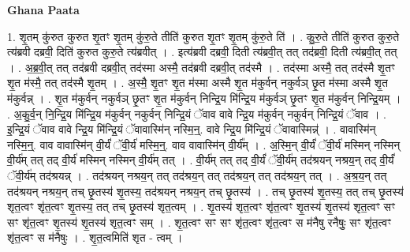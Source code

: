\documentclass[17pt]{extarticle}
\begin{document}
\textbf{Ghana Paata } \newline

1. शृ॒तम् कु॑रुत कुरुत शृ॒तꣳ शृ॒तम् कु॑रु॒ते तीति॑ कुरुत शृ॒तꣳ शृ॒तम् कु॑रु॒ते ति॑ । . कु॒रु॒ते तीति॑ कुरुत कुरु॒ते त्य॑ब्रवी दब्रवी॒ दिति॑ कुरुत कुरु॒ते त्य॑ब्रवीत् । . इत्य॑ब्रवी दब्रवी॒ दिती त्य॑ब्रवी॒त् तत् तद॑ब्रवी॒ दिती त्य॑ब्रवी॒त् तत् । . अ॒ब्र॒वी॒त् तत् तद॑ब्रवी दब्रवी॒त् तद॑स्मा अस्मै॒ तद॑ब्रवी दब्रवी॒त् तद॑स्मै । . तद॑स्मा अस्मै॒ तत् तद॑स्मै शृ॒तꣳ शृ॒त म॑स्मै॒ तत् तद॑स्मै शृ॒तम् । . अ॒स्मै॒ शृ॒तꣳ शृ॒त म॑स्मा अस्मै शृ॒त म॑कुर्वन् नकुर्वञ् छृ॒त म॑स्मा अस्मै शृ॒त म॑कुर्वन्न् । . शृ॒त म॑कुर्वन् नकुर्वञ् छृ॒तꣳ शृ॒त म॑कुर्वन् निन्द्रि॒य मि॑न्द्रि॒य म॑कुर्वञ् छृ॒तꣳ शृ॒त म॑कुर्वन् निन्द्रि॒यम् । . अ॒कु॒र्व॒न् नि॒न्द्रि॒य मि॑न्द्रि॒य म॑कुर्वन् नकुर्वन् निन्द्रि॒यं ॅवाव वावे न्द्रि॒य म॑कुर्वन् नकुर्वन् निन्द्रि॒यं ॅवाव । . इ॒न्द्रि॒यं ॅवाव वावे न्द्रि॒य मि॑न्द्रि॒यं ॅवावास्मि॑न् नस्मि॒न्॒. वावे न्द्रि॒य मि॑न्द्रि॒यं ॅवावास्मिन्न्॑ । . वावास्मि॑न् नस्मि॒न्॒. वाव वावास्मि॑न् वी॒र्यं॑ ॅवी॒र्य॑ मस्मि॒न्॒. वाव वावास्मि॑न् वी॒र्य᳚म् । . अ॒स्मि॒न् वी॒र्यं॑ ॅवी॒र्य॑ मस्मिन् नस्मिन् वी॒र्य॑म् तत् तद् वी॒र्य॑ मस्मिन् नस्मिन् वी॒र्य॑म् तत् । . वी॒र्य॑म् तत् तद् वी॒र्यं॑ ॅवी॒र्य॑म् तद॑श्रयन् नश्रय॒न् तद् वी॒र्यं॑ ॅवी॒र्य॑म् तद॑श्रयन्न् । . तद॑श्रयन् नश्रय॒न् तत् तद॑श्रय॒न् तत् तद॑श्रय॒न् तत् तद॑श्रय॒न् तत् । . अ॒श्र॒य॒न् तत् तद॑श्रयन् नश्रय॒न् तच् छृ॒तस्य॑ शृ॒तस्य॒ तद॑श्रयन् नश्रय॒न् तच् छृ॒तस्य॑ । . तच् छृ॒तस्य॑ शृ॒तस्य॒ तत् तच् छृ॒तस्य॑ शृत॒त्वꣳ शृ॑त॒त्वꣳ शृ॒तस्य॒ तत् तच् छृ॒तस्य॑ शृत॒त्वम् । . शृ॒तस्य॑ शृत॒त्वꣳ शृ॑त॒त्वꣳ शृ॒तस्य॑ शृ॒तस्य॑ शृत॒त्वꣳ सꣳ सꣳ शृ॑त॒त्वꣳ शृ॒तस्य॑ शृ॒तस्य॑ शृत॒त्वꣳ सम् । . शृ॒त॒त्वꣳ सꣳ सꣳ शृ॑त॒त्वꣳ शृ॑त॒त्वꣳ स म॑नैषु रनैषुः॒ सꣳ शृ॑त॒त्वꣳ शृ॑त॒त्वꣳ स म॑नैषुः । . शृ॒त॒त्वमिति॑ शृत - त्वम् । \newline
\end{document}
